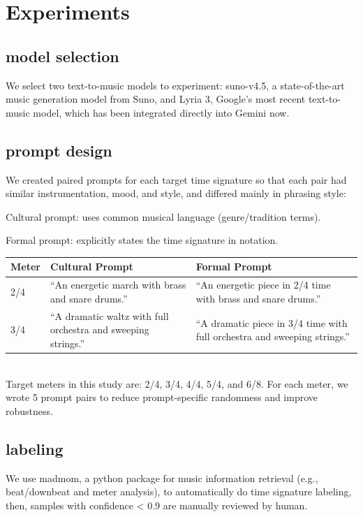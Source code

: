 \documentclass{article}
\begin{document}
\section{Experiments}

\subsection{model selection}
We select two text-to-music models to experiment: suno-v4.5, a state-of-the-art music generation model from Suno,  and Lyria 3,  Google's most recent text-to-music model, which has been integrated directly into Gemini now. 

\subsection{prompt design}
We created paired prompts for each target time signature so that each pair had similar instrumentation, mood, and style, and differed mainly in phrasing style:

Cultural prompt: uses common musical language (genre/tradition terms).

Formal prompt: explicitly states the time signature in notation.


\begin{tabular}{p{2cm} p{6.2cm} p{6.2cm}}
\toprule
\textbf{Meter} & \textbf{Cultural Prompt} & \textbf{Formal Prompt} \\
\midrule

2/4 &
``An energetic march with brass and snare drums.'' &
``An energetic piece in 2/4 time with brass and snare drums.'' \\

3/4 &
``A dramatic waltz with full orchestra and sweeping strings.'' &
``A dramatic piece in 3/4 time with full orchestra and sweeping strings.'' \\

\bottomrule
\end{tabular}
\\

Target meters in this study are: 2/4, 3/4, 4/4, 5/4, and 6/8.
For each meter, we wrote 5 prompt pairs to reduce prompt-specific randomness and improve robustness.

\subsection{labeling}
We use madmom, a python package for music information retrieval (e.g., beat/downbeat and meter analysis), to automatically do time signature labeling, then, samples with confidence < 0.9 are manually reviewed by human. 
\end{document}
